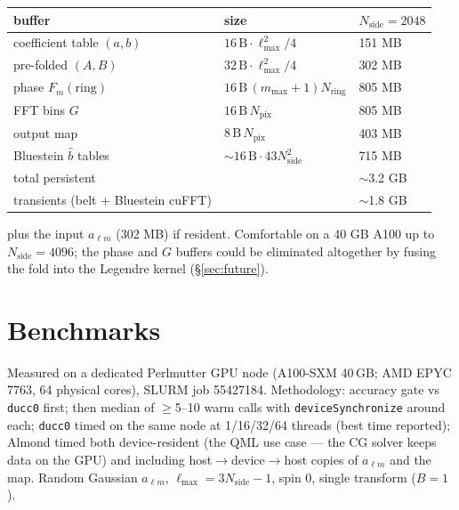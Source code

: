 \documentclass[11pt]{article}
\begin{document}
\begin{center}
\begin{tabular}{lll}
\toprule
buffer & size & $N_\mathrm{side}=2048$ \\
\midrule
coefficient table $(a,b)$ & $16\,\mathrm{B}\cdot\ell_{\max}^2/4$ & 151 MB \\
pre-folded $(A,B)$        & $32\,\mathrm{B}\cdot\ell_{\max}^2/4$ & 302 MB \\
phase $F_m(\mathrm{ring})$ & $16\,\mathrm{B}\,(m_{\max}{+}1)N_\mathrm{ring}$ & 805 MB \\
FFT bins $G$              & $16\,\mathrm{B}\,N_\mathrm{pix}$ & 805 MB \\
output map                & $8\,\mathrm{B}\,N_\mathrm{pix}$ & 403 MB \\
Bluestein $\hat b$ tables & $\sim 16\,\mathrm{B}\cdot 43 N_\mathrm{side}^2$ & 715 MB \\
\midrule
total persistent          & & $\sim$3.2 GB \\
transients (belt + Bluestein cuFFT) & & $\sim$1.8 GB \\
\bottomrule
\end{tabular}
\end{center}
plus the input $a_{\ell m}$ (302 MB) if resident.  Comfortable on a 40 GB
A100 up to $N_\mathrm{side} = 4096$; the phase and $G$ buffers could be
eliminated altogether by fusing the fold into the Legendre kernel
(\S\ref{sec:future}).

\section{Benchmarks}
\label{sec:results}

Measured on a dedicated Perlmutter GPU node (A100-SXM 40\,GB; AMD EPYC
7763, 64 physical cores), SLURM job 55427184.  Methodology: accuracy gate
vs \texttt{ducc0} first; then median of $\ge$5--10 warm calls with
\texttt{deviceSynchronize} around each; \texttt{ducc0} timed on the same
node at 1/16/32/64 threads (best time reported); Almond timed both
device-resident (the QML use case --- the CG solver keeps data on the GPU)
and including host$\to$device$\to$host copies of $a_{\ell m}$ and the map.
Random Gaussian $a_{\ell m}$, $\ell_{\max} = 3N_\mathrm{side}-1$, spin 0,
single transform ($B=1$).

\begin{center}

\end{center}
\end{document}
